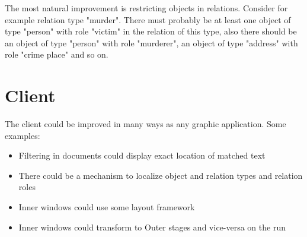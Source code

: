 The most natural improvement is restricting objects in relations. Consider for
example relation type "murder". There must probably be at least one object of
type "person" with role "victim" in the relation of this type, also there
should be an object of type "person" with role "murderer", an object of type
"address" with role "crime place" and so on.


\section{Client}
The \textan{} client could be improved in many ways as any graphic application.
Some examples:

\begin{itemize}
	\item Filtering in documents could display exact location of matched text
	\item There could be a mechanism to localize object and relation types and
	relation roles
	\item Inner windows could use some layout framework
	\item Inner windows could transform to Outer stages and vice-versa on the
	run
\end{itemize}
